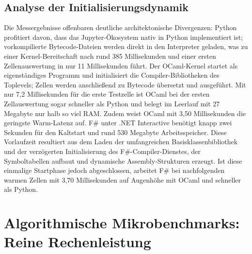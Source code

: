 \subsection{Analyse der Initialisierungsdynamik}
Die Messergebnisse offenbaren deutliche architektonische Divergenzen:
Python profitiert davon, dass das Jupyter-Ökosystem nativ in Python implementiert ist; vorkompilierte Bytecode-Dateien werden direkt in den Interpreter geladen, was zu einer Kernel-Bereitschaft nach rund 385 Millisekunden und einer ersten Zellenauswertung in nur 11 Millisekunden führt.
Der OCaml-Kernel startet als eigenständiges Programm und initialisiert die Compiler-Bibliotheken des Toplevels; Zellen werden anschließend zu Bytecode übersetzt und ausgeführt.
Mit nur 7,2 Millisekunden für die erste Testzelle ist OCaml bei der ersten Zellauswertung sogar schneller als Python und belegt im Leerlauf mit 27 Megabyte nur halb so viel RAM.
Zudem weist OCaml mit 3,50 Millisekunden die geringste Warm-Latenz auf.
F\# unter .NET Interactive benötigt knapp zwei Sekunden für den Kaltstart und rund 530 Megabyte Arbeitsspeicher.
Diese Vorlaufzeit resultiert aus dem Laden der umfangreichen Basisklassenbibliothek und der verzögerten Initialisierung des F\#-Compiler-Dienstes, der Symboltabellen aufbaut und dynamische Assembly-Strukturen erzeugt.
Ist diese einmalige Startphase jedoch abgeschlossen, arbeitet F\# bei nachfolgenden warmen Zellen mit 3,70 Millisekunden auf Augenhöhe mit OCaml und schneller als Python.

\section{Algorithmische Mikrobenchmarks: Reine Rechenleistung}
\label{sec:microbenchmarks}

